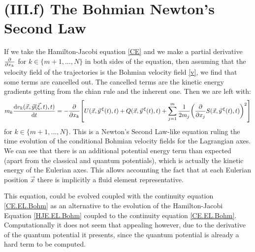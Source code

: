 \documentclass[11pt, a4paper]{article} %
\begin{document}
\section*{(III.f) The Bohmian Newton's Second Law}
If we take the Hamilton-Jacobi equation \eqref{CE} and we make a partial derivative $\pdv{}{x_k}$ for $k\in\{m+1,...,N\}$ in both sides of the equation, then assuming that the velocity field of the trajectories is the Bohmian velocity field \eqref{v}, we find that some terms are cancelled out. The cancelled terms are the kinetic energy gradients getting from the chian rule and the inherent one. Then we are left with:
\begin{equation}
m_k\dv{v_k(\vec{x},\vec{y}(\vec{\xi},t),t)}{t}=-\pdv{}{x_k}\qty[U(\vec{x},\vec{y}^{\, \xi}(t),t)+Q(\vec{x},\vec{y}^{\, \xi}(t),t)+\sum_{j=1}^m \frac{1}{2m_j}\qty(\pdv{}{x_j}S(\vec{x},\vec{y}^{\, \xi}(t),t))^2]
\end{equation}
for  $k\in\{m+1,...,N\}$. This is a Newton's Second Law-like equation ruling the time evolution of the conditional Bohmian velocity fields for the Lagrangian axes. We can see that there is an additional potential energy term than expected (apart from the classical and quantum potentials), which is actually the kinetic energy of the Eulerian axes. This allows accounting the fact that at each Eulerian position $\vec{x}$ there is implicitly a fluid element representative.

This equation, could be evolved coupled with the continuity equation \eqref{CE.EL.Bohm} as an alternative to the evolution of the Hamilton-Jacobi Equation \eqref{HJE.EL.Bohm} coupled to the continuity equation  \eqref{CE.EL.Bohm}. Computationally it does not seem that appealing however, due to the derivative of the quantum potential it presents, since the quantum potential is already a hard term to be computed.

\end{document}
